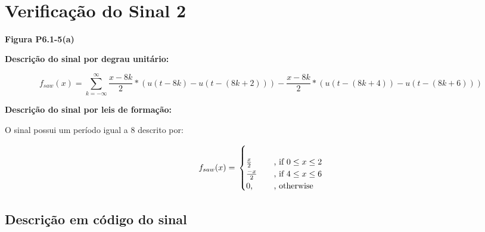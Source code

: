 \documentclass{article}
\begin{document}
    \begin{center}
    \end{center}
    { \hspace*{\fill} \\}
    
    \hypertarget{verificauxe7uxe3o-do-sinal-2}{%
\section{Verificação do Sinal 2}\label{verificauxe7uxe3o-do-sinal-2}}

\textbf{Figura P6.1-5(a)}

\textbf{Descrição do sinal por degrau unitário:}

\[
f_{saw}(x) = 
  \sum_{k = -\infty}^{\infty} 
    \frac{x - 8k}{2} * 
      (u(t - 8k) - 
      u(t - (8k + 2))) -
    \frac{x - 8k}{2} * 
      (u(t - (8k + 4)) - 
      u(t - (8k + 6)))       
\]

\textbf{Descrição do sinal por leis de formação:}

O sinal possui um período igual a \(8\) descrito por:

\[
f_{saw}(x) = \\
  \begin{cases} \\
    \frac{x}{2} & \quad \text{, if }  0 \leq x \leq 2 \\
    \frac{-x}{2} & \quad \text{, if }  4 \leq x \leq 6 \\
    \text{0, } & \quad \text{, otherwise} \\
  \end{cases}
\]

    \hypertarget{descriuxe7uxe3o-em-cuxf3digo-do-sinal}{%
\subsection{Descrição em código do
sinal}\label{descriuxe7uxe3o-em-cuxf3digo-do-sinal}}
\end{document}
